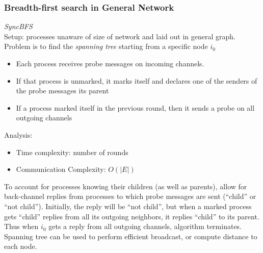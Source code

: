 \documentclass[a4paper,10pt,]{article}
\begin{document}
\subsubsection{Breadth-first search in General Network}
\emph{SyncBFS}\\
Setup: processes unaware of size of network and laid out in general graph. \\
Problem is to find the \emph{spanning tree} starting from a specific node $i_0$
\begin{itemize}
  \item Each process receives probe messages on incoming channels.
  \item If that process is unmarked, it marks itself and declares one of the senders of the probe messages its parent
  \item If a process marked itself in the previous round, then it sends a probe on all outgoing channels
\end{itemize}
Analysis:
\begin{itemize}
  \item Time complexity: number of rounds
  \item Communication Complexity: $O(|E|)$
\end{itemize}
To account for processes knowing their children (as well as parents), allow for back-channel replies from processes to which probe messages are sent (``child'' or ``not child'').  Initially, the reply will be ``not child'', but when a marked process gets ``child'' replies from all its outgoing neighbors, it replies ``child'' to its parent.  Thus when $i_0$ gets a reply from all outgoing channels, algorithm terminates.\\
Spanning tree can be used to perform efficient broadcast, or compute distance to each node.
\end{document}
